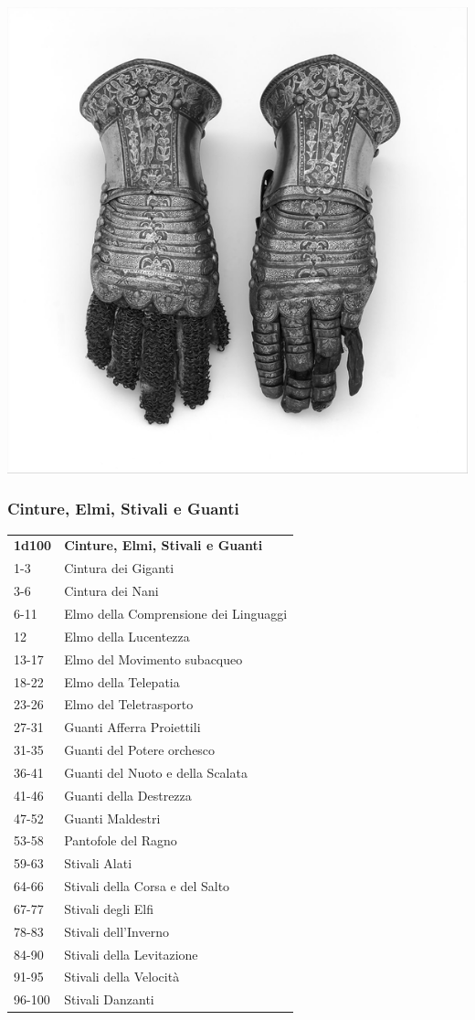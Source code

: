 \begin{multicols}{2}
\begin{center}
\includegraphics[width=0.8\linewidth]{immagini/gauntlet.png}\\
\end{center}


\subsubsection{Cinture, Elmi, Stivali e Guanti}

\begin{tabularx}{0.45\textwidth}{lX}
\textbf{1d100} & \textbf{Cinture, Elmi, Stivali e Guanti}\\
1-3 &Cintura dei Giganti\\
3-6 &Cintura dei Nani\\
6-11 &Elmo della Comprensione dei Linguaggi\\
12 &Elmo della Lucentezza\\
13-17 &Elmo del Movimento subacqueo\\
18-22 &Elmo della Telepatia\\
23-26 &Elmo del Teletrasporto\\
27-31 &Guanti Afferra Proiettili\\
31-35 &Guanti del Potere orchesco\\
36-41 &Guanti del Nuoto e della Scalata\\
41-46 &Guanti della Destrezza\\
47-52 &Guanti Maldestri\\
53-58 &Pantofole del Ragno\\
59-63 &Stivali Alati\\
64-66 &Stivali della Corsa e del Salto\\
67-77 &Stivali degli Elfi\\
78-83 &Stivali dell'Inverno\\
84-90 &Stivali della Levitazione\\
91-95 &Stivali della Velocità\\
96-100 &Stivali Danzanti\\
\end{tabularx}


\end{multicols}
